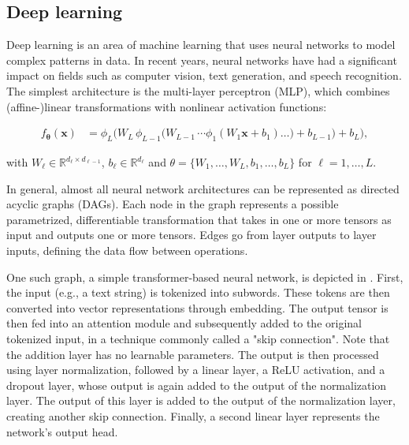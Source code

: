 \documentclass[article]{jss}
\theoremstyle{definition}
\begin{document}
\subsection{Deep learning}\label{sec:background_dl}

Deep learning is an area of machine learning that uses neural networks to model complex patterns in data.
In recent years, neural networks have had a significant impact on fields such as computer vision, text generation, and speech recognition.
The simplest architecture is the multi-layer perceptron (MLP), which combines (affine-)linear transformations with nonlinear activation functions:

\begin{align}
f_{\boldsymbol{\theta}}(\mathbf{x}) &=
  \phi_{L}\!\bigl(
    W_{L}\,\phi_{L-1}\!\bigl(
      W_{L-1}\,\dotsm\phi_{1}(W_{1}\mathbf{x}+b_{1}) \ldots )+ b_{L - 1}
    \bigr)+b_{L}
  \bigr),
\end{align}

\noindent
with \(W_{\ell}\in\mathbb{R}^{d_{\ell}\times d_{\ell-1}}\), \(b_{\ell}\in\mathbb{R}^{d_{\ell}}\) and \(\theta = \{W_1, \ldots, W_L, b_1, \ldots, b_L\}\) for \(\ell=1,\dots,L\).

In general, almost all neural network architectures can be represented as directed acyclic graphs (DAGs).
Each node in the graph represents a possible parametrized, differentiable transformation that takes in one or more tensors as input and outputs one or more tensors.
Edges go from layer outputs to layer inputs, defining the data flow between operations.

One such graph, a simple transformer-based neural network, is depicted in .
First, the input (e.g., a text string) is tokenized into subwords. These tokens are then converted into vector representations through embedding.
The output tensor is then fed into an attention module and subsequently added to the original tokenized input, in a technique commonly called a "skip connection".
Note that the addition layer has no learnable parameters.
The output is then processed using layer normalization, followed by a linear layer, a ReLU activation, and a dropout layer, whose output is again added to the output of the normalization layer. 
The output of this layer is added to the output of the normalization layer, creating another skip connection.
Finally, a second linear layer represents the network's output head.
\end{document}
